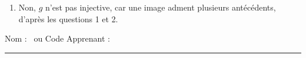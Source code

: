 {\begin{enumerate}
		Choisir $z=1, s=-1$ aboutit au vecteur de la question $2$.
		
		Tout autre choix aboutira à un troisième vecteur pas encore cité.
		Par exemple, $z=1, s=0$ donne
			\[  \begin{pmatrix}3+2z-3s\\-1-z-4s\\z\\s\\s\end{pmatrix} =  \begin{pmatrix}5\\-2\\1\\0\\0\end{pmatrix}. \]
		\item
		Non, $g$ n'est pas injective, car une image adment plusieurs antécédents, d'après les questions 1 et 2.
	\end{enumerate}
}


\newpage


\null\vspace{-20pt}
Nom : \hrulefill ~ou Code Apprenant :  \rule{3cm}{.1pt}



\fillwithlines{\fill}

\newpage

\fillwithlines{\fill}





\label{lastpage}
\newpage
{}
\shipoutAnswer


